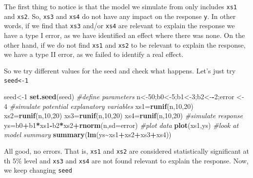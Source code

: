 \documentclass[
]{book}
\newenvironment{Shaded}{\begin{snugshade}}{\end{snugshade}}
\newcommand{\AttributeTok}[1]{\textcolor[rgb]{0.13,0.29,0.53}{#1}}
\newcommand{\CommentTok}[1]{\textcolor[rgb]{0.56,0.35,0.01}{\textit{#1}}}
\newcommand{\DecValTok}[1]{\textcolor[rgb]{0.00,0.00,0.81}{#1}}
\newcommand{\FunctionTok}[1]{\textcolor[rgb]{0.13,0.29,0.53}{\textbf{#1}}}
\newcommand{\NormalTok}[1]{#1}
\newcommand{\OtherTok}[1]{\textcolor[rgb]{0.56,0.35,0.01}{#1}}
\newcommand{\SpecialCharTok}[1]{\textcolor[rgb]{0.81,0.36,0.00}{\textbf{#1}}}
\begin{document}
The first thing to notice is that the model we simulate from only includes \texttt{xs1} and \texttt{xs2}. So, \texttt{xs3} and \texttt{xs4} do not have any impact on the response \texttt{y}. In other words, if we find that \texttt{xs3} and/or \texttt{xs4} are relevant to explain the response we have a type I error, as we have identified an effect where there was none. On the other hand, if we do not find \texttt{xs1} and \texttt{xs2} to be relevant to explain the response, we have a type II error, as we failed to identify a real effect.

So we try different values for the seed and check what happens. Let's just try \texttt{seed\textless{}-1}

\begin{Shaded}
\begin{Highlighting}[]
\NormalTok{seed}\OtherTok{\textless{}{-}}\DecValTok{1}
\FunctionTok{set.seed}\NormalTok{(seed)}
\CommentTok{\#define parameters}
\NormalTok{n}\OtherTok{\textless{}{-}}\DecValTok{50}\NormalTok{;b0}\OtherTok{\textless{}{-}}\DecValTok{5}\NormalTok{;b1}\OtherTok{\textless{}{-}}\DecValTok{3}\NormalTok{;b2}\OtherTok{\textless{}{-}}\SpecialCharTok{{-}}\DecValTok{2}\NormalTok{;error }\OtherTok{\textless{}{-}} \DecValTok{4}
\CommentTok{\#simulate potential explanatory variables}
\NormalTok{xs1}\OtherTok{=}\FunctionTok{runif}\NormalTok{(n,}\DecValTok{10}\NormalTok{,}\DecValTok{20}\NormalTok{)}
\NormalTok{xs2}\OtherTok{=}\FunctionTok{runif}\NormalTok{(n,}\DecValTok{10}\NormalTok{,}\DecValTok{20}\NormalTok{)}
\NormalTok{xs3}\OtherTok{=}\FunctionTok{runif}\NormalTok{(n,}\DecValTok{10}\NormalTok{,}\DecValTok{20}\NormalTok{)}
\NormalTok{xs4}\OtherTok{=}\FunctionTok{runif}\NormalTok{(n,}\DecValTok{10}\NormalTok{,}\DecValTok{20}\NormalTok{)}
\CommentTok{\#simulate response}
\NormalTok{ys}\OtherTok{=}\NormalTok{b0}\SpecialCharTok{+}\NormalTok{b1}\SpecialCharTok{*}\NormalTok{xs1}\SpecialCharTok{{-}}\NormalTok{b2}\SpecialCharTok{*}\NormalTok{xs2}\SpecialCharTok{+}\FunctionTok{rnorm}\NormalTok{(n,}\AttributeTok{sd=}\NormalTok{error)}
\CommentTok{\#plot data}
\FunctionTok{plot}\NormalTok{(xs1,ys)}
\CommentTok{\#look at model summary}
\FunctionTok{summary}\NormalTok{(}\FunctionTok{lm}\NormalTok{(ys}\SpecialCharTok{\textasciitilde{}}\NormalTok{xs1}\SpecialCharTok{+}\NormalTok{xs2}\SpecialCharTok{+}\NormalTok{xs3}\SpecialCharTok{+}\NormalTok{xs4))}
\end{Highlighting}
\end{Shaded}

All good, no errors. That is, \texttt{xs1} and \texttt{xs2} are considered statistically significant at th 5\% level and \texttt{xs3} and \texttt{xs4} are not found relevant to explain the response. Now, we keep changing \texttt{seed}
\end{document}
